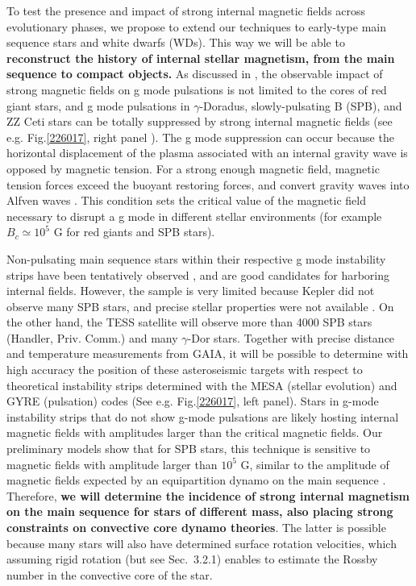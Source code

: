 To test the presence and impact of strong internal magnetic fields across evolutionary phases,
we propose to extend our techniques to early-type main sequence stars and white dwarfs (WDs). This way we will be able to \textbf{reconstruct the history of internal stellar magnetism, from the main sequence to compact objects.} As discussed in \citet{Cantiello_2016}, the observable impact of strong magnetic fields on g mode pulsations is not limited to the cores of red giant stars, and g mode pulsations in $\gamma$-Doradus, slowly-pulsating B (SPB), and ZZ Ceti stars can be totally suppressed by strong internal magnetic fields (see e.g. Fig.\ref{226017}, right panel ). The g mode suppression can occur because the horizontal displacement of the plasma associated with an internal gravity wave is opposed by magnetic tension. For a strong enough magnetic field, magnetic tension forces exceed the buoyant restoring forces, and convert gravity waves into Alfven waves \cite{lecoanet:17}. This condition sets the critical value of the magnetic field necessary to disrupt a g mode in different stellar environments (for example $B_c \simeq 10^5$ G for red giants and SPB stars). 

Non-pulsating main sequence stars within their respective g mode instability strips have been tentatively observed \citep{Balona_2011}, and are good candidates for harboring internal fields.
However, the sample is very limited because Kepler did not observe many SPB stars, and precise stellar properties were not available . On the other hand, the TESS satellite will observe more than 4000 SPB stars (Handler, Priv. Comm.) and many $\gamma$-Dor stars. Together with precise distance and temperature measurements from GAIA, it will be possible to determine with high accuracy the position of these asteroseismic targets with respect to theoretical instability strips determined with the MESA (stellar evolution) and GYRE (pulsation) codes (See e.g. Fig.\ref{226017}, left panel).
Stars in g-mode instability strips that do not show g-mode pulsations are likely hosting internal magnetic fields with amplitudes larger than the critical
magnetic fields. Our preliminary models show that for SPB stars, this technique is sensitive to magnetic fields with amplitude larger than $10^5$ G,
similar to the amplitude of magnetic fields expected by an equipartition dynamo on the main sequence \citep[See e.g.][]{Featherstone_2009,Augustson_2016}. Therefore, \textbf{we will determine the incidence of strong internal magnetism on the main sequence for stars of different mass, also placing strong constraints on convective core dynamo theories}. The latter is possible because many stars will also have determined surface rotation velocities, which assuming rigid rotation (but see Sec.~3.2.1) enables to estimate the Rossby number in the convective core of the star.

